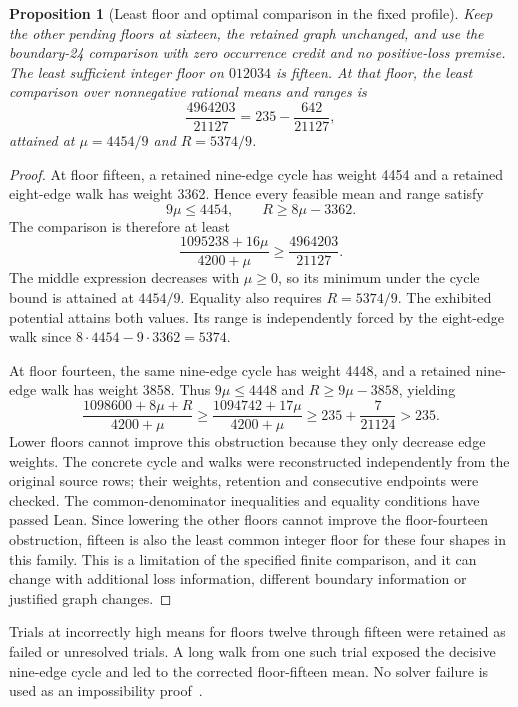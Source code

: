 \documentclass[11pt,a4paper]{article}
\newtheorem{proposition}[theorem]{Proposition}
\theoremstyle{definition}
\theoremstyle{remark}
\begin{document}
\begin{proposition}[Least floor and optimal comparison in the fixed profile]
\label{prop:floor15-optimum}
Keep the other pending floors at sixteen, the retained graph unchanged,
and use the boundary-24 comparison with zero occurrence credit and no
positive-loss premise. The least sufficient integer floor on $012034$
is fifteen. At that floor, the least comparison over nonnegative rational
means and ranges is
\[
\frac{4964203}{21127}=235-\frac{642}{21127},
\]
attained at $\mu=4454/9$ and $R=5374/9$.
\end{proposition}
\begin{proof}
At floor fifteen, a retained nine-edge cycle has weight 4454 and a
retained eight-edge walk has weight 3362. Hence every feasible mean and
range satisfy
\[
9\mu\le4454,\qquad R\ge8\mu-3362.
\]
The comparison is therefore at least
\[
\frac{1095238+16\mu}{4200+\mu}
\ge\frac{4964203}{21127}.
\]
The middle expression decreases with $\mu\ge0$, so its minimum under
the cycle bound is attained at $4454/9$. Equality also requires
$R=5374/9$. The exhibited potential attains both values. Its range is
independently forced by the eight-edge walk since
$8\cdot4454-9\cdot3362=5374$.

At floor fourteen, the same nine-edge cycle has weight 4448, and a
retained nine-edge walk has weight 3858. Thus
$9\mu\le4448$ and $R\ge9\mu-3858$, yielding
\[
\frac{1098600+8\mu+R}{4200+\mu}
\ge\frac{1094742+17\mu}{4200+\mu}
\ge235+\frac7{21124}>235.
\]
Lower floors cannot improve this obstruction because they only decrease
edge weights. The concrete cycle and walks were reconstructed independently
from the original source rows; their weights, retention and consecutive
endpoints were checked. The common-denominator inequalities and equality
conditions have passed Lean. Since lowering the other floors cannot improve the floor-fourteen
obstruction, fifteen is also the least common integer floor for these
four shapes in this family. This is a limitation of the specified finite
comparison, and it can change with additional loss information, different
boundary information or justified graph changes.
\end{proof}
Trials at incorrectly high means for floors twelve through fifteen were
retained as failed or unresolved trials. A long walk from one such trial
exposed the decisive nine-edge cycle and led to the corrected floor-fifteen
mean. No solver failure is used as an impossibility proof~\cite{boundary176archive}.
\end{document}
